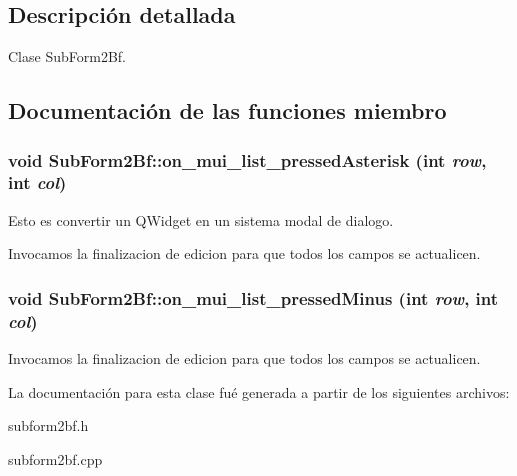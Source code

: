\subsection{Descripci\'{o}n detallada}
Clase Sub\-Form2Bf. 



\subsection{Documentaci\'{o}n de las funciones miembro}
\subsubsection{\setlength{\rightskip}{0pt plus 5cm}void Sub\-Form2Bf::on\_\-mui\_\-list\_\-pressed\-Asterisk (int {\em row}, int {\em col})\hspace{0.3cm}{\tt  [virtual, slot]}}\label{classSubForm2Bf_i2}


Esto es convertir un QWidget en un sistema modal de dialogo.

Invocamos la finalizacion de edicion para que todos los campos se actualicen. 
\subsubsection{\setlength{\rightskip}{0pt plus 5cm}void Sub\-Form2Bf::on\_\-mui\_\-list\_\-pressed\-Minus (int {\em row}, int {\em col})\hspace{0.3cm}{\tt  [virtual, slot]}}\label{classSubForm2Bf_i3}


Invocamos la finalizacion de edicion para que todos los campos se actualicen. 

La documentaci\'{o}n para esta clase fu\'{e} generada a partir de los siguientes archivos:\begin{CompactItemize}
\item 
subform2bf.h\item 
subform2bf.cpp\end{CompactItemize}
